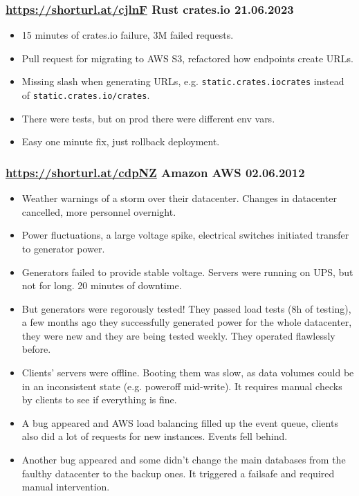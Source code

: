 \documentclass[handout]{beamer}
\begin{document}
\begin{frame}
	\frametitle{
		\href{https://shorturl.at/cjlnF}{https://shorturl.at/cjlnF}
		Rust crates.io
		21.06.2023
	}
	\begin{itemize}
		\item 15 minutes of crates.io failure, 3M failed requests. \pause
		\item Pull request for migrating to AWS S3, refactored how endpoints create URLs. \pause
		\item Missing slash when generating URLs, e.g. \texttt{static.crates.iocrates} instead of \texttt{static.crates.io/crates}. \pause
		\item There were tests, but on prod there were different env vars. \pause
		\item Easy one minute fix, just rollback deployment.
	\end{itemize}
\end{frame}

\begin{frame}
	\frametitle{
		\href{https://shorturl.at/cdpNZ}{https://shorturl.at/cdpNZ}
		Amazon AWS
		02.06.2012
	}
	\begin{itemize}
		\item Weather warnings of a storm over their datacenter.
			Changes in datacenter cancelled, more personnel overnight. \pause
		\item Power fluctuations, a large voltage spike, electrical switches initiated transfer to generator power. \pause
		\item Generators failed to provide stable voltage. Servers were running on UPS, but not for long. 20 minutes of downtime. \pause
		\item But generators were regorously tested! They passed load tests (8h of testing), a few months ago they successfully generated power for the whole datacenter, they were new and they are being tested weekly.
			They operated flawlessly before.  \pause
		\item Clients' servers were offline. Booting them was slow, as data volumes could be in an inconsistent state (e.g. poweroff mid-write). It requires manual checks by clients to see if everything is fine. \pause
		\item A bug appeared and AWS load balancing filled up the event queue, clients also did a lot of requests for new instances. Events fell behind. \pause
		\item Another bug appeared and some  didn't change the main databases
			from the faulthy datacenter to the backup ones. It triggered a failsafe and required manual intervention.
	\end{itemize}
\end{frame}
\end{document}
